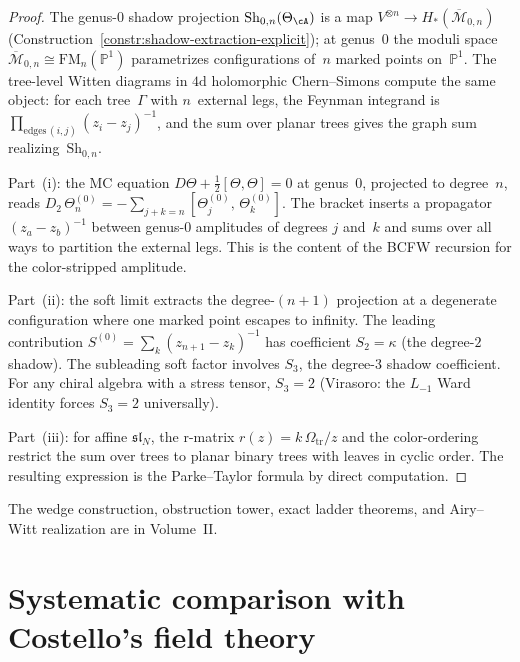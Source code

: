 \begin{proof}
The genus-$0$ shadow projection
$\mathrm{Sh}_{0,n}(\Theta_\cA)$ is a map
$V^{\otimes n} \to H_*(\overline{\mathcal{M}}_{0,n})$
(Construction~\ref{constr:shadow-extraction-explicit});
at genus~$0$ the moduli space
$\overline{\mathcal{M}}_{0,n} \cong \mathrm{FM}_n(\mathbb{P}^1)$
parametrizes configurations of~$n$ marked points on~$\mathbb{P}^1$.
The tree-level Witten diagrams in $4\mathrm{d}$ holomorphic
Chern--Simons compute the same object: for each tree~$\Gamma$
with $n$~external legs, the Feynman integrand is
$\prod_{\text{edges}\,(i,j)} (z_i - z_j)^{-1}$, and the sum
over planar trees gives the graph sum
realizing~$\mathrm{Sh}_{0,n}$.

Part~(i): the MC equation
$D\Theta + \frac{1}{2}[\Theta,\Theta] = 0$ at genus~$0$,
projected to degree~$n$, reads
$D_2\,\Theta_n^{(0)}
= -\sum_{j+k=n} [\Theta_j^{(0)},\,\Theta_k^{(0)}]$.
The bracket inserts a propagator $(z_a - z_b)^{-1}$ between
genus-$0$ amplitudes of degrees $j$ and~$k$ and sums over all
ways to partition the external legs. This is the content of the
BCFW recursion for the color-stripped amplitude.

Part~(ii): the soft limit
extracts the degree-$(n{+}1)$ projection at a degenerate
configuration where one marked point escapes to infinity.
The leading contribution
$S^{(0)} = \sum_k (z_{n+1} - z_k)^{-1}$ has coefficient
$S_2 = \kappa$ (the degree-$2$ shadow). The subleading soft
factor involves $S_3$, the degree-$3$ shadow coefficient. For
any chiral algebra with a stress tensor, $S_3 = 2$
(Virasoro: the $L_{-1}$ Ward identity forces
$S_3 = 2$ universally).

Part~(iii): for affine $\mathfrak{sl}_N$, the r-matrix
$r(z) = k\,\Omega_{\mathrm{tr}}/z$
and the color-ordering restrict the sum over trees to planar
binary trees with leaves in cyclic order. The resulting
expression is the Parke--Taylor formula by direct computation.
\end{proof}

The wedge construction, obstruction tower, exact ladder theorems,
and Airy--Witt realization are in Volume~II\@.

\section{Systematic comparison with Costello's field theory}
\label{sec:costello-comparison}


